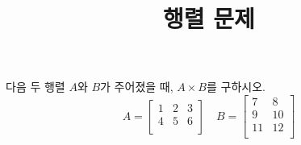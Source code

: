

    \title{행렬 문제}

    다음 두 행렬 \( A \)와 \( B \)가 주어졌을 때, \( A \times B \)를 구하시오.  
          \[
          A = \begin{bmatrix}
          1 & 2 & 3 \\
          4 & 5 & 6 \\
          \end{bmatrix}
          \quad
          B = \begin{bmatrix}
          7 & 8 \\
          9 & 10 \\
          11 & 12 \\
          \end{bmatrix}
          \]
      
    